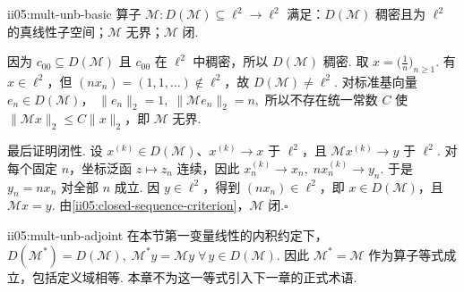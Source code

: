 \begin{FAProposition}{ii05:mult-unb-basic}
算子
\(\displaystyle \mathcal M:D(\mathcal M)\subseteq\ell^2\to\ell^2\)
满足：\(\displaystyle D(\mathcal M)\) 稠密且为 \(\displaystyle\ell^2\) 的真线性子空间；\(\displaystyle\mathcal M\) 无界；\(\displaystyle\mathcal M\) 闭.
\end{FAProposition}

\begin{FAProof}
因为 \(\displaystyle c_{00}\subseteq D(\mathcal M)\) 且 \(\displaystyle c_{00}\) 在 \(\displaystyle\ell^2\) 中稠密，所以 \(\displaystyle D(\mathcal M)\) 稠密. 取
\(\displaystyle x=\bigl(\frac{1}{n}\bigr)_{n\geqslant1}.\)
有 \(\displaystyle x\in\ell^2\)，但 \(\displaystyle(nx_n)=(1,1,\dots)\notin\ell^2\)，故 \(\displaystyle D(\mathcal M)\neq\ell^2\). 对标准基向量 \(\displaystyle e_n\in D(\mathcal M)\)，
\(\displaystyle \|e_n\|_2=1, \; \|\mathcal Me_n\|_2=n,\)
所以不存在统一常数 \(\displaystyle C\) 使 \(\displaystyle\|\mathcal Mx\|_2\leqslant C\|x\|_2\)，即 \(\displaystyle\mathcal M\) 无界.

最后证明闭性. 设 \(\displaystyle x^{(k)}\in D(\mathcal M)\)、\(\displaystyle x^{(k)}\to x\) 于 \(\displaystyle\ell^2\)，且 \(\displaystyle\mathcal Mx^{(k)}\to y\) 于 \(\displaystyle\ell^2\). 对每个固定 \(\displaystyle n\)，坐标泛函 \(\displaystyle z\mapsto z_n\) 连续，因此
\(\displaystyle x_n^{(k)}\to x_n, \; n x_n^{(k)}\to y_n.\)
于是 \(\displaystyle y_n=nx_n\) 对全部 \(\displaystyle n\) 成立. 因 \(\displaystyle y\in\ell^2\)，得到 \(\displaystyle(nx_n)\in\ell^2\)，即 \(\displaystyle x\in D(\mathcal M)\)，且 \(\displaystyle\mathcal Mx=y\). 由\autoref{ii05:closed-sequence-criterion}，\(\displaystyle\mathcal M\) 闭.\hfill\(\square\)
\end{FAProof}

\begin{FAProposition}[B][伴随的精确计算]{ii05:mult-unb-adjoint}
在本节第一变量线性的内积约定下，
\(\displaystyle D(\mathcal M^*)=D(\mathcal M), \; \mathcal M^*y=\mathcal My \;\forall\,y\in D(\mathcal M).\)
因此 \(\displaystyle\mathcal M^*=\mathcal M\) 作为算子等式成立，包括定义域相等. 本章不为这一等式引入下一章的正式术语.
\end{FAProposition}

